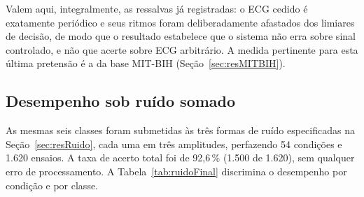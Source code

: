 \begin{table}[htb]
\centering
\caption{Matriz de confusão da configuração final sobre \acs{ECG} sem ruído (30 segmentos por classe).}
\label{tab:matrizBat13}
\end{table}

Valem aqui, integralmente, as ressalvas já registradas: o \acs{ECG} cedido é exatamente periódico e seus ritmos foram deliberadamente afastados dos limiares de decisão, de modo que o resultado estabelece que o sistema não erra sobre sinal controlado, e não que acerte sobre \acs{ECG} arbitrário. A medida pertinente para esta última pretensão é a da base MIT-BIH (Seção~\ref{sec:resMITBIH}).

\subsection{Desempenho sob ruído somado}
\label{sec:resFinalRuido}

As mesmas seis classes foram submetidas às três formas de ruído especificadas na
Seção~\ref{sec:resRuido}, cada uma em três amplitudes, perfazendo 54 condições e 1.620
ensaios. A taxa de acerto total foi de 92,6\,\% (1.500 de 1.620), sem qualquer erro de
processamento. A Tabela~\ref{tab:ruidoFinal} discrimina o desempenho por condição e por
classe.

